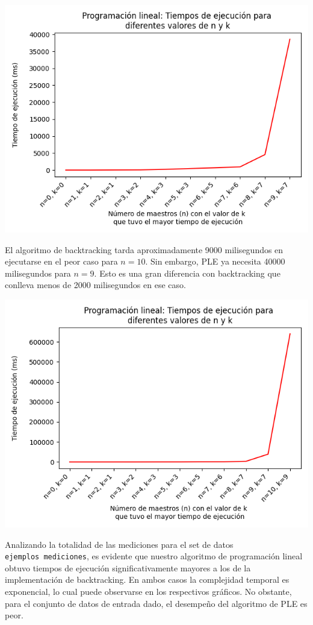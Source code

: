 \documentclass{article}
\begin{document}
\includegraphics[scale=0.60]{images/graficoProgramacionLinealSin10.png}

El algoritmo de backtracking tarda aproximadamente 9000 milisegundos en ejecutarse en el peor caso para $n = 10$. Sin embargo, PLE ya necesita 40000 milisegundos para $n = 9$. Esto es una gran diferencia con backtracking que conlleva menos de 2000 milisegundos en ese caso.

\includegraphics[scale=0.60]{images/graficoProgramacionLineal.png}

Analizando la totalidad de las mediciones para el set de datos \texttt{ejemplos\
 mediciones}, es evidente que nuestro algoritmo de programación lineal obtuvo tiempos de ejecución significativamente mayores a los de la implementación de backtracking. En ambos casos la complejidad temporal es exponencial, lo cual puede observarse en los respectivos gráficos. No obstante, para el conjunto de datos de entrada dado, el desempeño del algoritmo de PLE es peor.
\end{document}
